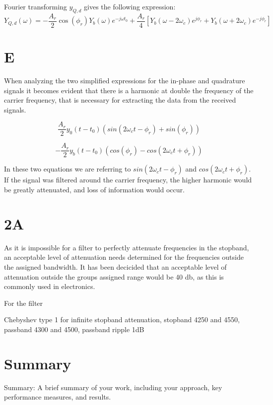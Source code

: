 \documentclass{article}[11]
\begin{document}
Fourier transforming $y_{Q, d}$ gives the following expression:
\begin{equation}
Y_{Q, d}(\omega) = -\frac{A_r}{2} \cos(\phi_r) Y_b(\omega) e^{-j \omega t_0} + \frac{A_r}{4} \left[ Y_b(\omega - 2\omega_c)e^{j \phi_r} + Y_b(\omega + 2\omega_c)e^{-j \phi_r} \right]
\end{equation}

\section{E}

When analyzing the two simplified expressions for the in-phase and quadrature signals it becomes evident that there is a harmonic at double the frequency of the carrier frequency, that is necessary for extracting the data from the received signals.

\begin{equation}
\frac{A_r}{2}y_0(t-t_0)(sin(2\omega_ct-\phi_r)+sin(\phi_r))
\end{equation}

\begin{equation}
-\frac{A_r}{2}y_b(t-t_0)(cos(\phi_r)-cos(2\omega_ct+\phi_r))
\end{equation}

In these two equations we are referring to $sin(2\omega_ct-\phi_r)$ and $cos(2\omega_ct+\phi_r)$. If the signal was filtered around the carrier frequency, the higher harmonic would be greatly attenuated, and loss of information would occur.


\section{2A}
As it is impossible for a filter to perfectly attenuate frequencies in the stopband, an acceptable level of attenuation needs determined for the frequencies outside the assigned bandwidth. It has been decicided that an acceptable level of attenuation outside the groups assigned range would be 40 db, as this is commonly used in electronics.


For the filter

Chebyshev type 1 for infinite stopband attenuation, stopband 4250 and 4550, passband 4300 and 4500, passband ripple 1dB




\section{Summary}
Summary: A brief summary of your work, including your approach, key performance
measures, and results.
\end{document}
